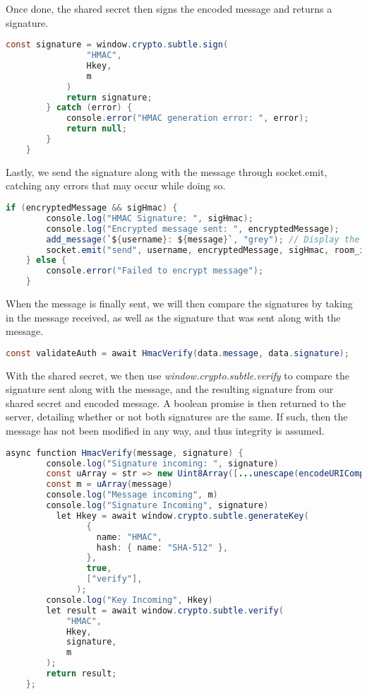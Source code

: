 \documentclass{article}
\begin{document}
Once done, the shared secret then signs the encoded message and returns a signature.

\begin{lstlisting}[language=Java]
            const signature = window.crypto.subtle.sign(
                "HMAC",
                Hkey,
                m 
            )
            return signature;
        } catch (error) {
            console.error("HMAC generation error: ", error);
            return null; 
        }
    }
\end{lstlisting}

Lastly, we send the signature along with the message through socket.emit, catching any errors that may occur while doing so.

\begin{lstlisting}[language=Java]
    if (encryptedMessage && sigHmac) {
        console.log("HMAC Signature: ", sigHmac);
        console.log("Encrypted message sent: ", encryptedMessage);
        add_message(`${username}: ${message}`, "grey"); // Display the original message directly
        socket.emit("send", username, encryptedMessage, sigHmac, room_id);
    } else {
        console.error("Failed to encrypt message");
    }
\end{lstlisting}

When the message is finally sent, we will then compare the signatures by taking in the message received, as well as the signature that was sent along with the message.

\begin{lstlisting}[language=Java]
const validateAuth = await HmacVerify(data.message, data.signature);
\end{lstlisting}

With the shared secret, we then use \textit{window.crypto.subtle.verify} to compare the signature sent along with the message, and the resulting signature from our shared secret and encoded message. A boolean promise is then returned to the server, detailing whether or not both signatures are the same. If such, then the message has not been modified in any way, and thus integrity is assumed.

\begin{lstlisting}[language=Java]
    async function HmacVerify(message, signature) {
        console.log("Signature incoming: ", signature)
        const uArray = str => new Uint8Array([...unescape(encodeURIComponent(str))].map(c => c.charCodeAt(0)));
        const m = uArray(message)  
        console.log("Message incoming", m)
        console.log("Signature Incoming", signature)
          let Hkey = await window.crypto.subtle.generateKey(
                {
                  name: "HMAC",
                  hash: { name: "SHA-512" },
                },
                true,
                ["verify"],
              );
        console.log("Key Incoming", Hkey)
        let result = await window.crypto.subtle.verify(
            "HMAC",
            Hkey,
            signature,
            m
        );
        return result;
    };
\end{lstlisting}
\end{document}
